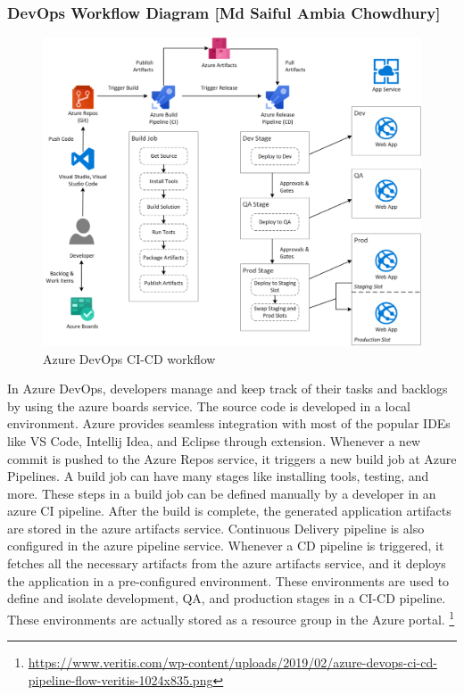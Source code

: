 \subsubsection{DevOps Workflow Diagram [Md Saiful Ambia Chowdhury]}
%
\begin{figure}[h]
    \centering
    \includegraphics[width=13cm]{images/saiful/azure-devops-ci-cd-pipeline-workflow.png}
    \caption{Azure DevOps CI-CD workflow}
    \label{fig:azure-devops-ci-cd-pipeline-workflow}
\end{figure}

In Azure DevOps, developers manage and keep track of their tasks and backlogs by using the azure boards service. The source code is developed in a local environment. Azure provides seamless integration with most of the popular IDEs like VS Code, Intellij Idea, and Eclipse through extension. Whenever a new commit is pushed to the Azure Repos service, it triggers a new build job at Azure Pipelines. A build job can have many stages like installing tools, testing, and more. These steps in a build job can be defined manually by a developer in an azure CI pipeline. After the build is complete, the generated application artifacts are stored in the azure artifacts service. Continuous Delivery pipeline is also configured in the azure pipeline service. Whenever a CD pipeline is triggered, it fetches all the necessary artifacts from the azure artifacts service, and it deploys the application in a pre-configured environment. These environments are used to define and isolate development, QA, and production stages in a CI-CD pipeline. These environments are actually stored as a resource group in the Azure portal. \footnote{\url{https://www.veritis.com/wp-content/uploads/2019/02/azure-devops-ci-cd-pipeline-flow-veritis-1024x835.png}}

